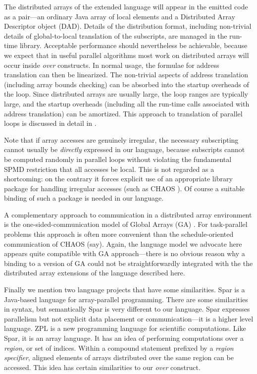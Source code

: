 The distributed arrays of the extended language will appear in the
emitted code as a pair---an ordinary Java array of local elements and a
Distributed Array Descriptor object (DAD).  Details of the distribution
format, including non-trivial details of global-to-local translation of
the subscripts, are managed in the run-time library.  Acceptable
performance should nevertheless be achievable, because we expect that in
useful parallel algorithms most work on distributed arrays
will occur inside {\em over} constructs.  In normal usage,
the formulae for address translation can then be linearized.  The non-trivial
aspects of address translation (including array bounds checking) can be
absorbed into the startup overheads of the loop.  Since distributed
arrays are usually large, the loop ranges are typically large, and
the startup overheads (including all the run-time calls associated with
address translation) can be amortized.  This approach to translation of
parallel loops is discussed in detail in \cite{NPAC_PCRC_kernel}.

Note that if array accesses are genuinely irregular, the necessary
subscripting
cannot usually be {\em directly} expressed in our language, because
subscripts cannot be computed randomly in parallel loops without
violating the fundamental SPMD restriction that all accesses be local.
This is not regarded as a shortcoming: on the contrary it forces explicit
use of an appropriate library package for handling irregular accesses
(such as CHAOS \cite{CHAOS}).  Of course a suitable binding of such a
package is needed in our language.

A complementary approach to communication in a distributed array
environment is the one-sided-communication model of Global Arrays (GA)
\cite{Global_Arrays}.  For task-parallel problems this
approach is often more convenient than the schedule-oriented
communication of CHAOS (say).  Again, the language model we advocate
here appears quite compatible with GA approach---there is no obvious
reason why a binding to a version of GA could not be straightforwardly
integrated with the the distributed array extensions of the language
described here.

Finally we mention two language projects that have some similarities.
Spar \cite{Spar} is a Java-based language for array-parallel programming.
There are some similarities in syntax, but
semantically Spar is very different to our language.  Spar expresses
parallelism but not explicit data placement or communication---it is a
higher level language.
ZPL \cite{ZPL} is a new programming language for scientific
computations.  Like Spar, it is an array language.  It has an idea of
performing computations over a {\em region}, or set of indices.  Within
a compound statement prefixed by a {\em region specifier}, aligned
elements of arrays distributed over the same region can be accessed.
This idea has certain similarities to our {\em over} construct.






